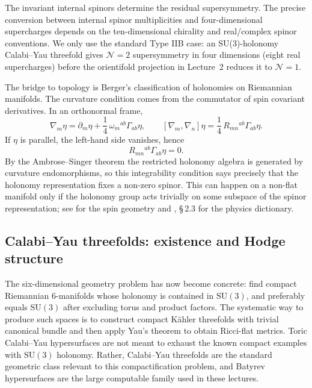 The invariant internal spinors determine the residual supersymmetry.
The precise conversion between internal spinor multiplicities and
four-dimensional supercharges depends on the ten-dimensional
chirality and real/complex spinor conventions. We only use the
standard Type IIB case: an SU($3$)-holonomy Calabi--Yau threefold
gives $\mathcal{N}=2$ supersymmetry in four dimensions (eight real
supercharges) before the orientifold projection in Lecture~2 reduces
it to $\mathcal{N}=1$.

The bridge to topology is Berger's classification of holonomies on
Riemannian manifolds. The curvature condition comes from the
commutator of spin covariant derivatives. In an orthonormal frame,
\begin{equation}
    \nabla_m\eta
    = \partial_m\eta
        + \frac14\,\omega_m{}^{ab}\Gamma_{ab}\eta ,
    \qquad
    [\nabla_m,\nabla_n]\eta
    = \frac14\,R_{mn}{}^{ab}\Gamma_{ab}\eta .
\end{equation}
If $\eta$ is parallel, the left-hand side vanishes, hence
\begin{equation}
    R_{mn}{}^{ab}\Gamma_{ab}\eta = 0 .
\end{equation}
By the Ambrose--Singer theorem the restricted holonomy algebra is
generated by curvature endomorphisms, so this integrability
condition says precisely that the holonomy representation fixes a
non-zero spinor. This can happen on a non-flat manifold only if the
holonomy group acts trivially on some subspace of the spinor
representation; see \cite{LawsonMichelsohn:1989} for the spin
geometry and \cite{McAllister:2025qwq}, \S\,2.3 for the physics
dictionary.


\subsection{Calabi--Yau threefolds: existence and Hodge structure}\label{ssec:L1-CY}

The six-dimensional geometry problem has now become concrete: find
compact Riemannian $6$-manifolds whose holonomy is contained in
$\mathrm{SU}(3)$, and preferably equals $\mathrm{SU}(3)$ after
excluding torus and product factors. The systematic way to produce
such spaces is to construct compact K\"ahler threefolds with
trivial canonical bundle and then apply Yau's theorem to obtain
Ricci-flat metrics. Toric Calabi--Yau hypersurfaces are not meant to
exhaust the known compact examples with
$\mathrm{SU}(3)$ holonomy. Rather, Calabi--Yau threefolds are the
standard geometric class relevant to this compactification problem,
and Batyrev hypersurfaces are the large computable family used in
these lectures.

